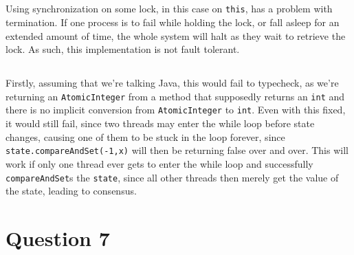 \documentclass[a5paper]{article}
\begin{document}
\subsection{}
Using synchronization on some lock, in this case on \texttt{this}, has a problem with termination. If one process is to fail while holding the lock, or fall asleep for an extended amount of time,
the whole system will halt as they wait to retrieve the lock. As such, this implementation is not fault tolerant.

\subsection{}
Firstly, assuming that we're talking Java, this would fail to typecheck, as we're returning an \texttt{AtomicInteger} from a method that supposedly returns an \texttt{int} and there is no implicit conversion from \texttt{AtomicInteger} to \texttt{int}. Even with this fixed, it would still fail, since two threads may enter the while loop before state changes, causing one of them to be stuck in the loop forever, since \texttt{state.compareAndSet(-1,x)} will then be returning false over and over. This will work if only one thread ever gets to enter the while loop and successfully \texttt{compareAndSet}s the \texttt{state}, since all other threads then merely get the value of the state, leading to consensus.

\section{Question 7}
\end{document}
